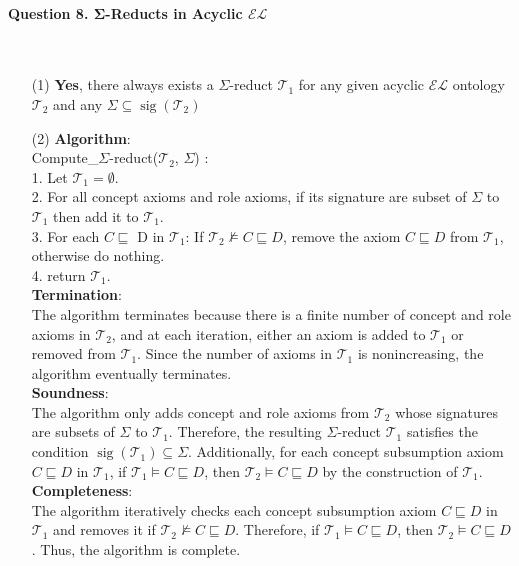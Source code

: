 \documentclass[12pt]{article}
\begin{document}
    \paragraph{Question 8. Σ-Reducts in Acyclic $\mathcal{EL}$}~{}
    \\
    \begin{enumerate}
        \item [(1)]    \textbf{Yes}, there always exists a $\Sigma$-reduct $\mathcal{T}_{1}$ for any given acyclic $\mathcal{EL}$ ontology $\mathcal{T}_{2}$ and any $\Sigma \subseteq \operatorname{sig}\left(\mathcal{T}_{2}\right)$
        \item [(2)]
        \textbf{Algorithm}: \\
        Compute\_$\Sigma$-reduct($\mathcal{T}_{2}$, $\Sigma$) : \\
        1. Let $\mathcal{T}_{1} = \emptyset$. \\
        2. For all concept axioms and role axioms, if its signature are subset of $\Sigma$ to $\mathcal{T}_{1}$ then add it to $\mathcal{T}_{1}$. \\
        3. For each  $C \sqsubseteq$ D in $\mathcal{T}_{1}$: If $\mathcal{T}_{2} \not \models C \sqsubseteq D$, remove the axiom $C \sqsubseteq D$ from $\mathcal{T}_{1}$, otherwise do nothing. \\
        4. return $\mathcal{T}_{1}$.  \\
        \textbf{Termination}:\\
        The algorithm terminates because there is a finite number of concept and role axioms in $\mathcal{T}_2$, and at each iteration, either an axiom is added to $\mathcal{T}_1$ or removed from $\mathcal{T}_1$. Since the number of axioms in $\mathcal{T}_1$ is nonincreasing, the algorithm eventually terminates.
        \\
        \textbf{Soundness}:\\
        The algorithm only adds concept and role axioms from $\mathcal{T}_2$ whose signatures are subsets of $\Sigma$ to $\mathcal{T}_1$. Therefore, the resulting $\Sigma$-reduct $\mathcal{T}_1$ satisfies the condition $\operatorname{sig}(\mathcal{T}_1) \subseteq \Sigma$. Additionally, for each concept subsumption axiom $C \sqsubseteq D$ in $\mathcal{T}_1$, if $\mathcal{T}_1 \models C \sqsubseteq D$, then $\mathcal{T}_2 \models C \sqsubseteq D$ by the construction of $\mathcal{T}_1$.
        \\
        \textbf{Completeness}:\\
        The algorithm iteratively checks each concept subsumption axiom $C \sqsubseteq D$ in $\mathcal{T}_1$ and removes it if $\mathcal{T}_2 \not\models C \sqsubseteq D$. Therefore, if $\mathcal{T}_1 \models C \sqsubseteq D$, then $\mathcal{T}_2 \models C \sqsubseteq D$. Thus, the algorithm is complete.
    \end{enumerate}
\end{document}
